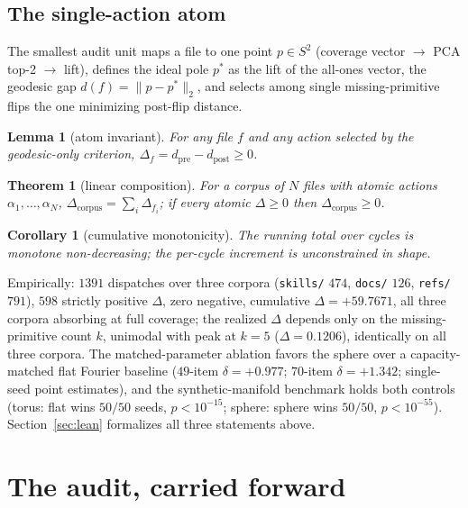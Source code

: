 \documentclass[11pt,a4paper]{article}
\theoremstyle{plain}
\newtheorem{theorem}{Theorem}
\newtheorem{lemma}{Lemma}
\newtheorem{corollary}{Corollary}
\theoremstyle{remark}
\begin{document}
\subsection{The single-action atom}
The smallest audit unit maps a file to one point $p\in S^2$ (coverage vector $\to$ PCA top-2 $\to$ lift), defines the ideal pole $p^*$ as the lift of the all-ones vector, the geodesic gap $d(f)=\|p-p^*\|_2$, and selects among single missing-primitive flips the one minimizing post-flip distance.

\begin{lemma}[atom invariant]
\label{lem:atom}
For any file $f$ and any action selected by the geodesic-only criterion, $\Delta_f=d_{\mathrm{pre}}-d_{\mathrm{post}}\ge0$.
\end{lemma}

\begin{theorem}[linear composition]
\label{thm:comp}
For a corpus of $N$ files with atomic actions $\alpha_1,\dots,\alpha_N$, $\Delta_{\mathrm{corpus}}=\sum_i\Delta_{f_i}$; if every atomic $\Delta\ge0$ then $\Delta_{\mathrm{corpus}}\ge0$.
\end{theorem}

\begin{corollary}[cumulative monotonicity]
\label{cor:mono}
The running total over cycles is monotone non-decreasing; the per-cycle increment is unconstrained in shape.
\end{corollary}

Empirically: $1391$ dispatches over three corpora (\texttt{skills/} $474$, \texttt{docs/} $126$, \texttt{refs/} $791$), $598$ strictly positive $\Delta$, zero negative, cumulative $\Delta=+59.7671$, all three corpora absorbing at full coverage; the realized $\Delta$ depends only on the missing-primitive count $k$, unimodal with peak at $k=5$ ($\Delta=0.1206$), identically on all three corpora. The matched-parameter ablation favors the sphere over a capacity-matched flat Fourier baseline ($49$-item $\delta=+0.977$; $70$-item $\delta=+1.342$; single-seed point estimates), and the synthetic-manifold benchmark holds both controls (torus: flat wins $50/50$ seeds, $p<10^{-15}$; sphere: sphere wins $50/50$, $p<10^{-55}$). Section~\ref{sec:lean} formalizes all three statements above.

\section{The audit, carried forward}
\label{sec:audit}
\end{document}
